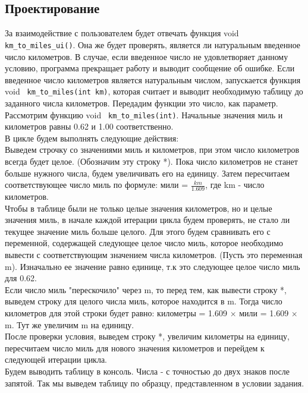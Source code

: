 \documentclass[12pt,a4paper]{report}
\begin{document}
\subsection{Проектирование}
За взаимодействие с пользователем будет отвечать функция void \verb+ km_to_miles_ui()+. Она же будет проверять, является ли натуральным введенное число километров. В случае, если введенное число не удовлетворяет данному условию, программа прекращает работу и выводит сообщение об ошибке. Если введенное число километров является натуральным числом, запускается функция void \verb+ km_to_miles(int km)+, которая считает и выводит необходимую таблицу до заданного числа километров. Передадим функции это число, как параметр. \\
Рассмотрим функцию void \verb+ km_to_miles(int)+. Начальные значения миль и километров равны 0.62 и 1.00 соответственно. \\
В цикле будем выполнять следующие действия: \\
Выведем строчку со значениями миль и километров, при этом число километров всегда будет целое. (Обозначим эту строку *). Пока число километров не станет больше нужного числа, будем увеличивать его на единицу. Затем пересчитаем соответствующее число миль по формуле: мили = $\frac{km}{1.609}$, где km - число километров. \\
Чтобы в таблице были не только целые значения километров, но и целые значения миль, в начале каждой итерации цикла будем проверять, не стало ли текущее значение миль больше целого. Для этого будем сравнивать его с переменной, содержащей следующее целое число миль, которое необходимо вывести с соответствующим значением числа километров. (Пусть это переменная m). Изначально ее значение равно единице, т.к это следующее целое число миль для 0.62. \\
Если число миль "перескочило" через m, то перед тем, как вывести строку *, выведем строку для целого числа миль, которое находится в m. Тогда число километров для этой строки будет равно: километры = 1.609 $\times$ мили = 1.609 $\times$ m. Тут же увеличим m на единицу. \\
После проверки условия, выведем строку *, увеличим километры на единицу, пересчитаем число миль для нового значения километров и перейдем к следующей итерации цикла.  \\
Будем выводить таблицу в консоль. Числа - с точностью до двух знаков после запятой. Так мы выведем таблицу по образцу, представленном в условии задания. 
\end{document}

